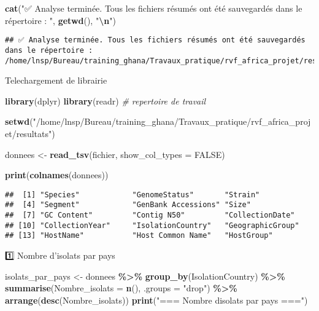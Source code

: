 \documentclass[
]{article}
\newenvironment{Shaded}{\begin{snugshade}}{\end{snugshade}}
\newcommand{\AttributeTok}[1]{\textcolor[rgb]{0.13,0.29,0.53}{#1}}
\newcommand{\CommentTok}[1]{\textcolor[rgb]{0.56,0.35,0.01}{\textit{#1}}}
\newcommand{\ConstantTok}[1]{\textcolor[rgb]{0.56,0.35,0.01}{#1}}
\newcommand{\FunctionTok}[1]{\textcolor[rgb]{0.13,0.29,0.53}{\textbf{#1}}}
\newcommand{\NormalTok}[1]{#1}
\newcommand{\OtherTok}[1]{\textcolor[rgb]{0.56,0.35,0.01}{#1}}
\newcommand{\SpecialCharTok}[1]{\textcolor[rgb]{0.81,0.36,0.00}{\textbf{#1}}}
\newcommand{\StringTok}[1]{\textcolor[rgb]{0.31,0.60,0.02}{#1}}
\begin{document}
\begin{Shaded}
\begin{Highlighting}[]
\FunctionTok{cat}\NormalTok{(}\StringTok{"✅ Analyse terminée. Tous les fichiers résumés ont été sauvegardés dans le répertoire : "}\NormalTok{, }\FunctionTok{getwd}\NormalTok{(), }\StringTok{"}\SpecialCharTok{\textbackslash{}n}\StringTok{"}\NormalTok{)}
\end{Highlighting}
\end{Shaded}

\begin{verbatim}
## ✅ Analyse terminée. Tous les fichiers résumés ont été sauvegardés dans le répertoire :  /home/lnsp/Bureau/training_ghana/Travaux_pratique/rvf_africa_projet/resultats
\end{verbatim}

Telechargement de librairie

\begin{Shaded}
\begin{Highlighting}[]
\FunctionTok{library}\NormalTok{(dplyr)}
\FunctionTok{library}\NormalTok{(readr)}
\CommentTok{\# repertoire de travail}

\FunctionTok{setwd}\NormalTok{(}\StringTok{"/home/lnsp/Bureau/training\_ghana/Travaux\_pratique/rvf\_africa\_projet/resultats"}\NormalTok{)}

\NormalTok{donnees }\OtherTok{\textless{}{-}} \FunctionTok{read\_tsv}\NormalTok{(fichier, }\AttributeTok{show\_col\_types =} \ConstantTok{FALSE}\NormalTok{)}

\FunctionTok{print}\NormalTok{(}\FunctionTok{colnames}\NormalTok{(donnees))}
\end{Highlighting}
\end{Shaded}

\begin{verbatim}
##  [1] "Species"            "GenomeStatus"       "Strain"            
##  [4] "Segment"            "GenBank Accessions" "Size"              
##  [7] "GC Content"         "Contig N50"         "CollectionDate"    
## [10] "CollectionYear"     "IsolationCountry"   "GeographicGroup"   
## [13] "HostName"           "Host Common Name"   "HostGroup"
\end{verbatim}

1️⃣ Nombre d'isolats par pays

\begin{Shaded}
\begin{Highlighting}[]
\NormalTok{isolats\_par\_pays }\OtherTok{\textless{}{-}}\NormalTok{ donnees }\SpecialCharTok{\%\textgreater{}\%}
  \FunctionTok{group\_by}\NormalTok{(IsolationCountry) }\SpecialCharTok{\%\textgreater{}\%}
  \FunctionTok{summarise}\NormalTok{(}\AttributeTok{Nombre\_isolats =} \FunctionTok{n}\NormalTok{(), }\AttributeTok{.groups =} \StringTok{"drop"}\NormalTok{) }\SpecialCharTok{\%\textgreater{}\%}
  \FunctionTok{arrange}\NormalTok{(}\FunctionTok{desc}\NormalTok{(Nombre\_isolats))}
\FunctionTok{print}\NormalTok{(}\StringTok{"=== Nombre d\textquotesingle{}isolats par pays ==="}\NormalTok{)}
\end{Highlighting}
\end{Shaded}
\end{document}

